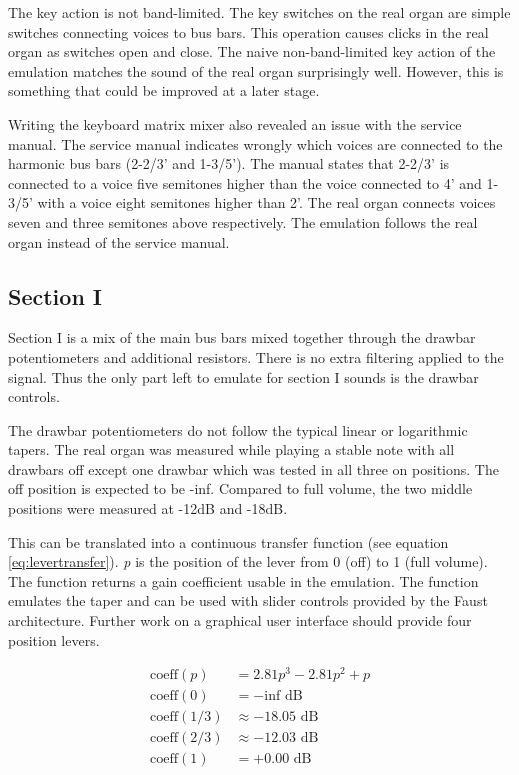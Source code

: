 \documentclass[11pt,a4paper]{article}
\begin{document}
The key action is not band-limited. The key switches on the real organ are simple switches connecting voices to bus bars. This operation causes clicks in the real organ as switches open and close. The naive non-band-limited key action of the emulation matches the sound of the real organ surprisingly well. However, this is something that could be improved at a later stage.

Writing the keyboard matrix mixer also revealed an issue with the service manual. The service manual indicates wrongly which voices are connected to the harmonic bus bars (2-2/3' and 1-3/5'). The manual states that 2-2/3' is connected to a voice five semitones higher than the voice connected to 4' and 1-3/5' with a voice eight semitones higher than 2'. The real organ connects voices seven and three semitones above respectively. The emulation follows the real organ instead of the service manual.

\subsection{Section I}
\label{section:section-I}

Section I is a mix of the main bus bars mixed together through the drawbar potentiometers and additional resistors. There is no extra filtering applied to the signal. Thus the only part left to emulate for section I sounds is the drawbar controls.

The drawbar potentiometers do not follow the typical linear or logarithmic tapers. The real organ was measured while playing a stable note with all drawbars off except one drawbar which was tested in all three on positions. The off position is expected to be -inf. Compared to full volume, the two middle positions were measured at -12dB and -18dB.

This can be translated into a continuous transfer function (see equation \ref{eq:levertransfer}). \emph{p} is the position of the lever from 0 (off) to 1 (full volume). The function returns a gain coefficient usable in the emulation. The function emulates the taper and can be used with slider controls provided by the Faust architecture. Further work on a graphical user interface should provide four position levers.

\begin{equation}
\label{eq:levertransfer}
\begin{split}
\mbox{coeff}(p) &= 2.81 p^3 - 2.81 p^2 + p \\
\mbox{coeff}(0) &= -\mbox{inf} \mbox{ dB}\\
\mbox{coeff}(1/3) &\approx -18.05 \mbox{ dB}\\
\mbox{coeff}(2/3) &\approx -12.03 \mbox{ dB}\\
\mbox{coeff}(1) &= +0.00 \mbox{ dB}
\end{split}
\end{equation}
\end{document}
